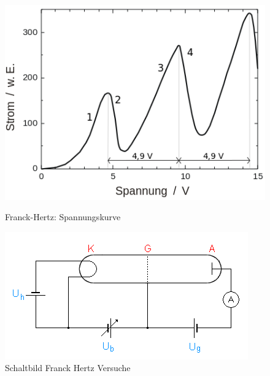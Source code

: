 \begin{figure}[htb]
    \centering
    \begin{minipage}{.45\linewidth}
        \centering
        \includegraphics[width=\linewidth]{../figs/Franck-Hertz_spannungskurve}
        \caption{Franck-Hertz: Spannungskurve}
        \label{fig:franck-hertz-spannungskurve}
    \end{minipage}
    \hspace{.5cm}
    \begin{minipage}{.45\linewidth}
        \centering
        \includegraphics[width=\linewidth]{../figs/Schaltbild_Franck_Hertz_Versuch}
        \caption{Schaltbild Franck Hertz Versuche}
        \label{fig:schaltbild_franck_hertz}
    \end{minipage}
\end{figure}

